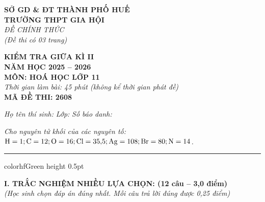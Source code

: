 \documentclass[11pt,a4paper]{article}
\begin{document}
\begin{minipage}[t]{0.48\textwidth}
\textbf{SỞ GD \& ĐT THÀNH PHỐ HUẾ}\\
\textbf{TRƯỜNG THPT GIA HỘI}\\
\textit{ĐỀ CHÍNH THỨC}\\
\textit{(Đề thi có 03 trang)}
\end{minipage}
\hfill
\begin{minipage}[t]{0.48\textwidth}
\raggedleft
\textbf{\color{hfRed}KIỂM TRA GIỮA KÌ II}\\
\textbf{NĂM HỌC 2025 -- 2026}\\
\textbf{MÔN: HOÁ HỌC LỚP 11}\\
\textit{Thời gian làm bài: 45 phút (không kể thời gian phát đề)}\\
\textbf{MÃ ĐỀ THI: 2608}
\end{minipage}

\vspace{4pt}
\noindent
\textit{Họ tên thí sinh:} \dotfill \textit{Lớp:} \dotfill \textit{Số báo danh:} \dotfill

\vspace{3pt}
\noindent
\textit{\footnotesize Cho nguyên tử khối của các nguyên tố: $\ce{H}=1; \ce{C}=12; \ce{O}=16; \ce{Cl}=35{,}5; \ce{Ag}=108; \ce{Br}=80; \ce{N}=14$.}

\vspace{3pt}
\hrule color{hfGreen} height 0.5pt

\vspace{4pt}
\noindent
{\color{mainGreen}\textbf{\large I. TRẮC NGHIỆM NHIỀU LỰA CHỌN: (12 câu -- 3,0 điểm)}}\\
\textit{\small (Học sinh chọn đáp án đúng nhất. Mỗi câu trả lời đúng được 0,25 điểm)}
\vspace{2pt}
\end{document}
